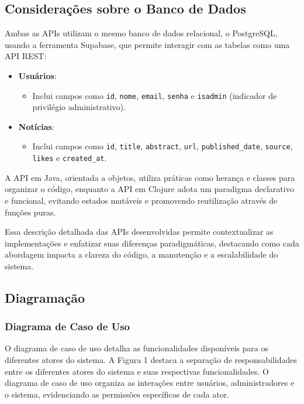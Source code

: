 \subsection{Considerações sobre o Banco de Dados}
Ambas as APIs utilizam o mesmo banco de dados relacional, o PostgreSQL, usando a ferramenta Supabase, que permite interagir com as tabelas como uma API REST:
\begin{itemize}
    \item \textbf{Usuários}:
    \begin{itemize}
        \item Inclui campos como \texttt{id}, \texttt{nome}, \texttt{email}, \texttt{senha} e \texttt{isadmin} (indicador de privilégio administrativo).
    \end{itemize}
    \item \textbf{Notícias}:
    \begin{itemize}
        \item Inclui campos como \texttt{id}, \texttt{title}, \texttt{abstract}, \texttt{url}, \texttt{published\_date}, \texttt{source}, \texttt{likes} e \texttt{created\_at}.
    \end{itemize}
\end{itemize}

A API em Java, orientada a objetos, utiliza práticas como herança e classes para organizar o código, enquanto a API em Clojure adota um paradigma declarativo e funcional, evitando estados mutáveis e promovendo reutilização através de funções puras.

Essa descrição detalhada das APIs desenvolvidas permite contextualizar as implementações e enfatizar suas diferenças paradigmáticas, destacando como cada abordagem impacta a clareza do código, a manutenção e a escalabilidade do sistema.



\subsection{Diagramação}

\subsubsection{Diagrama de Caso de Uso}

O diagrama de caso de uso detalha as funcionalidades disponíveis para os diferentes atores do sistema. A Figura 1 destaca a separação de responsabilidades entre os diferentes atores do sistema e suas respectivas funcionalidades. O diagrama de caso de uso organiza as interações entre usuários, administradores e o sistema, evidenciando as permissões específicas de cada ator.

